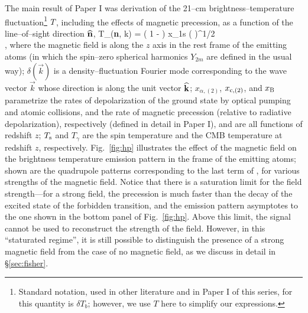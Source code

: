 The main result of Paper I was derivation of the 21--cm brightness--temperature fluctuation\footnote{Standard notation, used in other literature and in Paper I of this series, for this quantity is $\delta T_b$; however, we use $T$ here to simplify our expressions.} $T_{\rm }$, including the effects of magnetic precession, as a function of the line--of--sight direction ${\bf{\widehat n}}$, 
\beq
\bga
   T_{\rm }({\bf{\widehat n}}, {{\vec k}}) = \left( 1 -  \right) x_{1{\rm s}} \left(  \right)^{1/2} \\
  \times {} \mbox{,} 
\ega
\label{eq:tbsoln}
\eeq
where the magnetic field is along the $z$ axis in the rest frame of the emitting atoms (in which the spin--zero spherical harmonics $Y_{2 m}$ are defined in the usual way); $\delta(\vec k)$ is a density--fluctuation Fourier mode corresponding to the wave vector $\vec k$ whose direction is along the unit vector $\bf{\widehat k}$; $x_{\alpha, (2)}$, $x_{{\rm c}, (2)}$, and $x_{\rm B}$ parametrize the rates of depolarization of the ground state by optical pumping and atomic collisions, and the rate of magnetic precession (relative to radiative depolarization), respectively (defined in detail in Paper I), and are all functions of redshift $z$; $T_{\rm s}$ and $T_\gamma$ are the spin temperature and the CMB temperature at redshift $z$, respectively. Fig.~\ref{fig:hp} illustrates the effect of the magnetic field on the brightness temperature emission pattern in the frame of the emitting atoms; shown are the quadrupole patterns corresponding to the last term of \eq{\ref{eq:tbsoln}}, for various strengths of the magnetic field. Notice that there is a saturation limit for the field strength---for a strong field, the precession is much faster than the decay of the excited state of the forbidden transition, and the emission pattern asymptotes to the one shown in the bottom panel of Fig.~\ref{fig:hp}. Above this limit, the signal cannot be used to reconstruct the strength of the field. However, in this ``staturated regime'', it is still possible to distinguish the presence of a strong magnetic field from the case of no magnetic field, as we discuss in detail in \S\ref{sec:fisher}.
